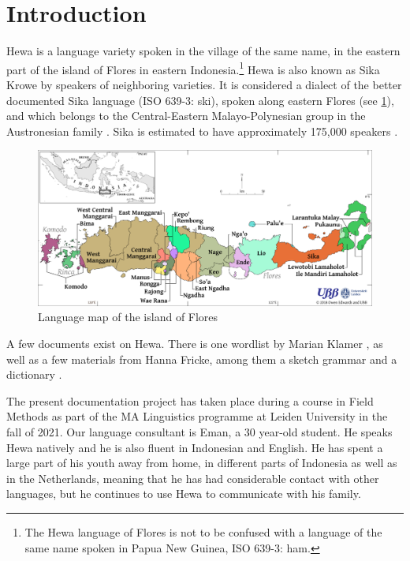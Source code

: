 \documentclass[../hewa_main-subfiles.tex]{subfiles}
\begin{document}
\section{Introduction}


Hewa is a language variety spoken in the village of the same name, in the eastern part of the island of Flores in eastern Indonesia.\footnote{The Hewa language of Flores is not to be confused with a language of the same name spoken in Papua New Guinea, ISO 639-3: ham.} Hewa is also known as Sika Krowe by speakers of neighboring varieties. It is considered a dialect of the better documented Sika language (ISO 639-3: ski), spoken along eastern Flores (see \cref{fig:langmap}), and which belongs to the Central-Eastern Malayo-Polynesian group in the Austronesian family \citep{Lewis1995}. Sika is estimated to have approximately 175,000 speakers \citep{Lewis1995}.


\begin{figure}[h]

\includegraphics[width=0.9\linewidth] {Images/flores_languages__inset_.png}

\caption{Language map of the island of Flores \citep{edwards_ubb_2018}}
\label{fig:langmap}
\end{figure}

A few documents exist on Hewa. There is one wordlist by Marian Klamer \citep{klamer_2015}, as well as a few materials from Hanna Fricke, among them a sketch grammar \citep{Fricke2014} and a dictionary \citep{fricke_2015}. 


The present documentation project has taken place during a course in Field Methods as part of the MA Linguistics programme at Leiden University in the fall of 2021. Our language consultant is Eman, a 30 year-old student. He speaks Hewa natively and he is also fluent in Indonesian and English. He has spent a large part of his youth away from home, in different parts of Indonesia as well as in the Netherlands, meaning that he has had considerable contact with other languages, but he continues to use Hewa to communicate with his family. 
\end{document}
